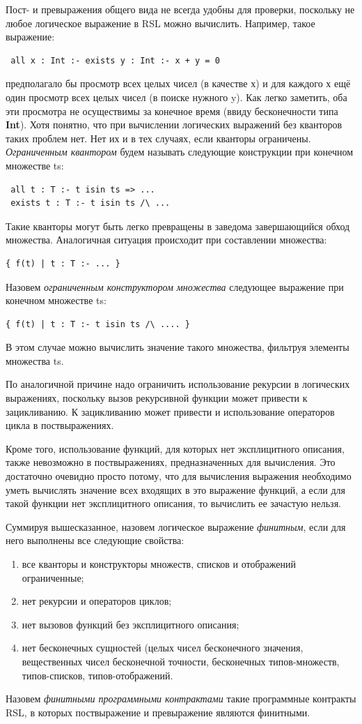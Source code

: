 \documentclass[14pt, twoside]{extreport}
\begin{document}
Пост- и превыражения общего вида не всегда удобны для проверки, поскольку не любое логическое выражение в RSL можно вычислить. Например, такое выражение:
\begin{lstlisting}
 all x : Int :- exists y : Int :- x + y = 0
\end{lstlisting}
предполагало бы просмотр всех целых чисел (в качестве х) и для каждого х ещё один просмотр всех целых чисел (в поиске нужного y). Как легко заметить, оба эти просмотра не осуществимы за конечное время (ввиду бесконечности типа \textbf{Int}). Хотя понятно, что при вычислении логических выражений без кванторов таких проблем нет. Нет их и в тех случаях, если кванторы ограничены. \emph{Ограниченным квантором} будем называть следующие конструкции при конечном множестве ts:
\begin{lstlisting}
 all t : T :- t isin ts => ...
 exists t : T :- t isin ts /\ ... 
\end{lstlisting}
Такие кванторы могут быть легко превращены в заведома завершающийся обход множества. Аналогичная ситуация происходит при составлении множества:
\begin{lstlisting}
{ f(t) | t : T :- ... }
\end{lstlisting}
Назовем \emph{ограниченным конструктором множества} следующее выражение при конечном множестве ts:
\begin{lstlisting}
{ f(t) | t : T :- t isin ts /\ .... }
\end{lstlisting}
В этом случае можно вычислить значение такого множества, фильтруя элементы множества ts.

По аналогичной причине надо ограничить использование рекурсии в логических выражениях, поскольку вызов рекурсивной функции может привести к зацикливанию. К зацикливанию может привести и использование операторов цикла в поствыражениях.

Кроме того, использование функций, для которых нет эксплицитного описания, также невозможно в поствыражениях, предназначенных для вычисления. Это достаточно очевидно просто потому, что для вычисления выражения необходимо уметь вычислять значение всех входящих в это выражение функций, а если для такой функции нет эксплицитного описания, то вычислить ее зачастую нельзя.

Суммируя вышесказанное, назовем логическое выражение \emph{финитным}, если для него выполнены все следующие свойства:
\begin{enumerate}
\item все кванторы и конструкторы множеств, списков и отображений ограниченные;
\item нет рекурсии и операторов циклов;
\item нет вызовов функций без эксплицитного описания;
\item нет бесконечных сущностей (целых чисел бесконечного значения, вещественных чисел бесконечной точности, бесконечных типов-множеств, типов-списков, типов-отображений.
\end{enumerate}
Назовем \emph{финитными программными контрактами} такие программные контракты RSL, в которых поствыражение и превыражение являются финитными.
\end{document}
